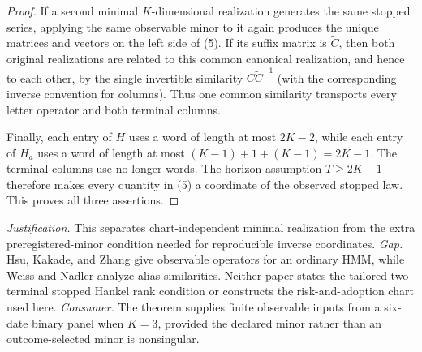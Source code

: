 \documentclass{article}
\begin{document}
\begin{proof}
If a second minimal \(K\)-dimensional realization generates the same stopped series, applying the same observable minor to it again produces the unique matrices and vectors on the left side of (5).  If its suffix matrix is \(\widetilde C\), then both original realizations are related to this common canonical realization, and hence to each other, by the single invertible similarity \(C\widetilde C^{-1}\) (with the corresponding inverse convention for columns).  Thus one common similarity transports every letter operator and both terminal columns.

Finally, each entry of \(H\) uses a word of length at most \(2K-2\), while each entry of \(H_a\) uses a word of length at most \((K-1)+1+(K-1)=2K-1\).  The terminal columns use no longer words.  The horizon assumption \(T\ge2K-1\) therefore makes every quantity in (5) a coordinate of the observed stopped law.  This proves all three assertions.
\end{proof}
\par\smallskip\noindent \textit{Justification.} This separates chart-independent minimal realization from the extra preregistered-minor condition needed for reproducible inverse coordinates. \textit{Gap.} Hsu, Kakade, and Zhang give observable operators for an ordinary HMM, while Weiss and Nadler analyze alias similarities. Neither paper states the tailored two-terminal stopped Hankel rank condition or constructs the risk-and-adoption chart used here. \textit{Consumer.} The theorem supplies finite observable inputs from a six-date binary panel when \(K=3\), provided the declared minor rather than an outcome-selected minor is nonsingular.
\end{document}
